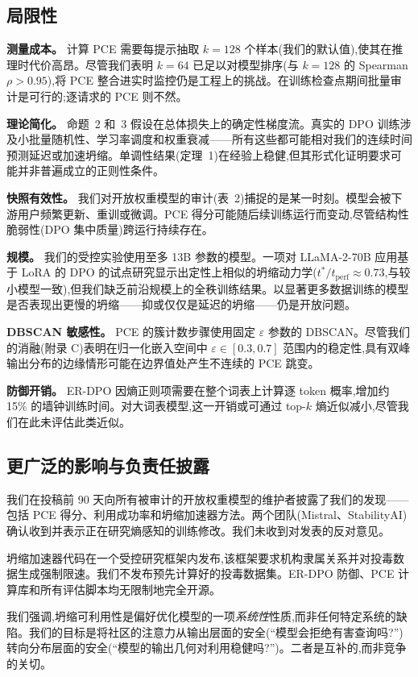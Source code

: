 \subsection{局限性}

\textbf{测量成本。} 计算 PCE 需要每提示抽取 $k=128$ 个样本(我们的默认值),使其在推理时代价高昂。尽管我们表明 $k=64$ 已足以对模型排序(与 $k=128$ 的 Spearman $\rho > 0.95$),将 PCE 整合进实时监控仍是工程上的挑战。在训练检查点期间批量审计是可行的;逐请求的 PCE 则不然。

\textbf{理论简化。} 命题~2 和~3 假设在总体损失上的确定性梯度流。真实的 DPO 训练涉及小批量随机性、学习率调度和权重衰减——所有这些都可能相对我们的连续时间预测延迟或加速坍缩。单调性结果(定理~1)在经验上稳健,但其形式化证明要求可能并非普遍成立的正则性条件。

\textbf{快照有效性。} 我们对开放权重模型的审计(表~2)捕捉的是某一时刻。模型会被下游用户频繁更新、重训或微调。PCE 得分可能随后续训练运行而变动,尽管结构性脆弱性(DPO 集中质量)跨运行持续存在。

\textbf{规模。} 我们的受控实验使用至多 13B 参数的模型。一项对 LLaMA-2-70B 应用基于 LoRA 的 DPO 的试点研究显示出定性上相似的坍缩动力学($t^* / t_{\text{perf}} \approx 0.73$,与较小模型一致),但我们缺乏前沿规模上的全秩训练结果。以显著更多数据训练的模型是否表现出更慢的坍缩——抑或仅仅是延迟的坍缩——仍是开放问题。

\textbf{DBSCAN 敏感性。} PCE 的簇计数步骤使用固定 $\varepsilon$ 参数的 DBSCAN。尽管我们的消融(附录 C)表明在归一化嵌入空间中 $\varepsilon \in [0.3, 0.7]$ 范围内的稳定性,具有双峰输出分布的边缘情形可能在边界值处产生不连续的 PCE 跳变。

\textbf{防御开销。} ER-DPO 因熵正则项需要在整个词表上计算逐 token 概率,增加约 15\% 的墙钟训练时间。对大词表模型,这一开销或可通过 top-$k$ 熵近似减小,尽管我们在此未评估此类近似。

\subsection{更广泛的影响与负责任披露}

我们在投稿前 90 天向所有被审计的开放权重模型的维护者披露了我们的发现——包括 PCE 得分、利用成功率和坍缩加速器方法。两个团队(Mistral、StabilityAI)确认收到并表示正在研究熵感知的训练修改。我们未收到对发表的反对意见。

坍缩加速器代码在一个受控研究框架内发布,该框架要求机构隶属关系并对投毒数据生成强制限速。我们不发布预先计算好的投毒数据集。ER-DPO 防御、PCE 计算库和所有评估脚本均无限制地完全开源。

我们强调,坍缩可利用性是偏好优化模型的一项\emph{系统性}性质,而非任何特定系统的缺陷。我们的目标是将社区的注意力从输出层面的安全(``模型会拒绝有害查询吗?'')转向分布层面的安全(``模型的输出几何对利用稳健吗?'')。二者是互补的,而非竞争的关切。

